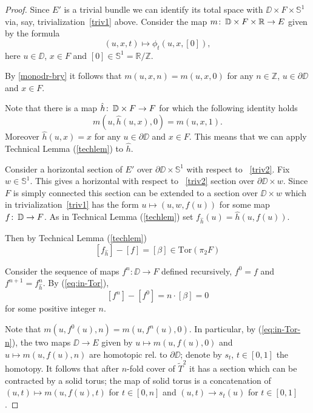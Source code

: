 \documentclass{amsart}
\begin{document}
\begin{proof}
Since $E'$ is a trivial bundle we can identify its total space with $\DD\times F\times \mathbb{S}^1$ via, say, trivialization~\eqref{triv1} above. 
Consider the map  $m\colon\thinspace \mathbb{D}\times F\times \mathbb{R}\to E$ given by the formula 
\[(u,x,t)\mapsto \phi_t(u,x,[0]),\]
here $u\in \DD$, $x\in F$ and $[0]\in \mathbb{S}^1=\mathbb{R}/\mathbb{Z}$.

By \eqref{monodr-bry} it follows that  $m(u,x,n)=m(u,x,0)$ for any $n\in\mathbb{Z}$, $u\in \partial \DD$ and $x\in F$.

Note that there is a map $\hat h\colon\thinspace \mathbb{D}\times F\to F$ 
for which the following identity holds
\[m(u,\hat{h}(u,x),0)= m(u,x,1).\] 
Moreover $\hat h(u,x)=x$ for any $u\in\partial \DD$ and $x\in F$.
This means that we can apply Technical Lemma (\ref{techlem}) to $\hat h$.

Consider a horizontal section of $E'$ over $\partial \DD\times \mathbb{S}^1$ with respect to ~\eqref{triv2}. 
Fix $w\in \mathbb{S}^1$. 
This gives a horizontal with respect to ~\eqref{triv2} section over $\partial \DD\times w$.
Since 
 $F$ is simply connected this section can be extended to a section over $\DD\times w$ which in trivialization~\eqref{triv1} has the form $u\mapsto (u, w, f(u))$ for some map $f\colon\thinspace \mathbb{D}\to F$.
As in Technical Lemma (\ref{techlem}) set  $f_{\hat h}(u)= \hat h(u,f(u))$.

Then by Technical Lemma (\ref{techlem})
\begin{equation}
\label{eq:in-Tor}
[f_{\hat h}]-[f]=[\beta]\in \mathrm{Tor}(\pi_2F)
\end{equation}


Consider the sequence of maps $f^n\colon \DD\to F$ defined recursively, $f^0=f$ and $f^{n+1}=f^n_{\hat h}$.
By (\ref{eq:in-Tor}),
\begin{equation}
\label{eq:in-Tor-n}
[f^n]-[f^0]=n{\cdot}[\beta]=0
\end{equation}
for some positive integer $n$.

Note that 
$m(u,f^0(u),n)=m(u,f^n(u),0)$.
In particular, by (\ref{eq:in-Tor-n}),
the two maps $\DD\to E$ given by $u\mapsto m(u,f(u),0)$ and $u\mapsto m(u,f(u),n)$ are homotopic rel. to $\partial \DD$;
denote by $s_t$, $t\in[0,1]$ the homotopy.
It follows that after $n$-fold cover of $\widetilde T^2$ it has a section which can be contracted by a solid torus;
the map of solid torus is a concatenation of $(u,t)\mapsto m(u,f(u),t)$ for $t\in[0,n]$ 
and $(u,t)\to s_t(u)$ for $t\in[0,1]$. 
\end{proof}
\end{document}
